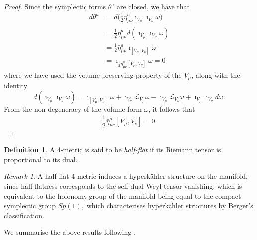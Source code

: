 \documentclass[a4paper,onecolumn,12pt]{article}
\theoremstyle{definition}
\newtheorem{defn}[thm]{Definition}
\theoremstyle{remark}
\newtheorem{rmk}[thm]{Remark}
\newcommand{\HK}{hyperk\"ahler }
\newcommand{\hooft}{\bar{\eta}}
\begin{document}
\begin{proof}
	Since the symplectic forms $\theta^{a}$ are closed, we have that
	\begin{align*}
		d\theta^{a} &= d\Big(\frac{1}{2}\hooft^{a}_{\mu\nu}\imath_{V_{\mu}}\imath_{V_{\nu}}\omega\Big)\\
		&= \frac{1}{2}\hooft^{a}_{\mu\nu}d(\imath_{V_{\mu}}\imath_{V_{\nu}}\omega)\\
		&= \frac{1}{2}\hooft^{a}_{\mu\nu}\imath_{[V_{\mu},V_{\nu}]}\omega\\
		&= \imath_{\frac{1}{2}\hooft^{a}_{\mu\nu}[V_{\mu},V_{\nu}]}\omega = 0
	\end{align*}
	where we have used the volume-preserving property of the $V_{\mu}$, along with the identity
	\begin{equation}
	\label{cartan}
		d(\imath_{V_{\mu}}\imath_{V_{\nu}}\omega) = \imath_{[V_{\mu},V_{\nu}]}\omega + \imath_{V_{\nu}}\mathcal{L}_{V_{\mu}}\omega - \imath_{V_{\mu}}\mathcal{L}_{V_{\nu}}\omega + \imath_{V_{\mu}}\imath_{V_{\nu}}d\omega.
	\end{equation}
	From the non-degeneracy of the volume form $\omega$, it follows that
	\begin{equation*}
	\label{half_flat}
	\frac{1}{2}\hooft^{a}_{\mu\nu}[V_{\mu},V_{\nu}] = 0.
	\end{equation*}\end{proof}
\begin{defn}
	\label{defn_half_flat}
	A 4-metric is said to be \emph{half-flat} if its Riemann tensor is proportional to its dual.\\
\end{defn}
\begin{rmk}
	\label{rmk_half_flat}
	A half-flat 4-metric induces a \HK structure on the manifold, since half-flatness corresponds to the self-dual Weyl tensor vanishing, which is equivalent to the holonomy group of the manifold being equal to the compact symplectic group $Sp(1),$ which characterises \HK structures by Berger's classification.
\end{rmk}
\newpage
We summarise the above results following \cite{hashimoto_1997}.
\end{document}
